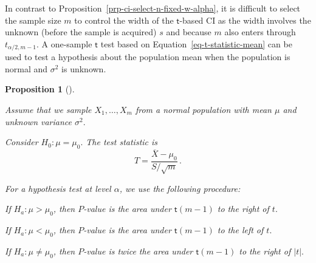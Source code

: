 \documentclass[
  a4paper,
  DIV=11,
  numbers=noendperiod,
  oneside]{scrreprt}
\theoremstyle{plain}
\theoremstyle{definition}
\theoremstyle{definition}
\theoremstyle{definition}
\theoremstyle{plain}
\newtheorem{proposition}{Proposition}[chapter]
\theoremstyle{remark}
\begin{document}
In contrast to Proposition~\ref{prp-ci-select-n-fixed-w-alpha}, it is
difficult to select the sample size \(m\) to control the width of the
\(\mathsf{t}\)-based CI as the width involves the unknown (before the
sample is acquired) \(s\) and because \(m\) also enters through
\(t_{\alpha/2, m-1}.\) A one-sample \(\mathsf{t}\) test based on
Equation~\ref{eq-t-statistic-mean} can be used to test a hypothesis
about the population mean when the population is normal and \(\sigma^2\)
is unknown.

\begin{proposition}[]\protect\hypertarget{prp-htest-mean-normal-var-unknown}{}\label{prp-htest-mean-normal-var-unknown}

Assume that we sample \(X_1, \dots, X_m\) from a normal population with
mean \(\mu\) and unknown variance \(\sigma^2.\)

Consider \(H_0 : \mu = \mu_0.\) The test statistic is \[
 T = \frac{\overline{X} - \mu_0}{S / \sqrt{m}} \,.
\]

For a hypothesis test at level \(\alpha\), we use the following
procedure:

If \(H_a : \mu > \mu_0\), then \(P\)-value is the area under
\(\mathsf{t}(m-1)\) to the right of \(t.\)

If \(H_a : \mu < \mu_0\), then \(P\)-value is the area under
\(\mathsf{t}(m-1)\) to the left of \(t.\)

If \(H_a : \mu \neq \mu_0\), then \(P\)-value is twice the area under
\(\mathsf{t}(m-1)\) to the right of \(|t|.\)

\end{proposition}
\end{document}
